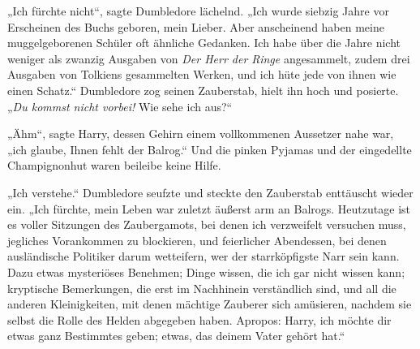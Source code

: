 „Ich fürchte nicht“, sagte Dumbledore lächelnd. „Ich wurde siebzig Jahre vor Erscheinen des Buchs geboren, mein Lieber. Aber anscheinend haben meine muggelgeborenen Schüler oft ähnliche Gedanken. Ich habe über die Jahre nicht weniger als zwanzig Ausgaben von \emph{Der Herr der Ringe} angesammelt, zudem drei Ausgaben von Tolkiens gesammelten Werken, und ich hüte jede von ihnen wie einen Schatz.“ Dumbledore zog seinen Zauberstab, hielt ihn hoch und posierte. „\emph{Du kommst nicht vorbei!} Wie sehe ich aus?“

„Ähm“, sagte Harry, dessen Gehirn einem vollkommenen Aussetzer nahe war, „ich glaube, Ihnen fehlt der Balrog.“ Und die pinken Pyjamas und der eingedellte Champignonhut waren beileibe keine Hilfe.

„Ich verstehe.“ Dumbledore seufzte und steckte den Zauberstab enttäuscht wieder ein. „Ich fürchte, mein Leben war zuletzt äußerst arm an Balrogs. Heutzutage ist es voller Sitzungen des Zaubergamots, bei denen ich verzweifelt versuchen muss, jegliches Vorankommen zu blockieren, und feierlicher Abendessen, bei denen ausländische Politiker darum wetteifern, wer der starrköpfigste Narr sein kann. Dazu etwas mysteriöses Benehmen; Dinge wissen, die ich gar nicht wissen kann; kryptische Bemerkungen, die erst im Nachhinein verständlich sind, und all die anderen Kleinigkeiten, mit denen mächtige Zauberer sich amüsieren, nachdem sie selbst die Rolle des Helden abgegeben haben. Apropos: Harry, ich möchte dir etwas ganz Bestimmtes geben; etwas, das deinem Vater gehört hat.“

